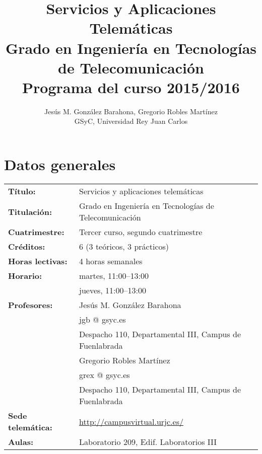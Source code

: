 \documentclass[a4paper,12pt]{article}
\title{Servicios y Aplicaciones Telemáticas \\
Grado en Ingeniería en Tecnologías de Telecomunicación \\
Programa del curso 2015/2016}
\author{Jesús M. González Barahona, Gregorio Robles Martínez \\
GSyC, Universidad Rey Juan Carlos}
\date{}
\begin{document}
\maketitle

\tableofcontents

\newpage

\section{Datos generales}

\begin{tabular}{ll}
\textbf{Título:} & Servicios y aplicaciones telemáticas \\
\textbf{Titulación:} & Grado en Ingeniería en Tecnologías de Telecomunicación \\
\textbf{Cuatrimestre:} & Tercer curso, segundo cuatrimestre \\
\textbf{Créditos:} & 6 (3 teóricos, 3 prácticos) \\
\textbf{Horas lectivas:} & 4 horas semanales \\
\textbf{Horario:} & martes, 11:00--13:00 \\
                  & jueves, 11:00--13:00 \\
\textbf{Profesores:}
& Jesús M. González Barahona \\
& \hspace{1cm}jgb @ gsyc.es \\
& \hspace{1cm}Despacho 110, Departamental III, Campus de Fuenlabrada\\
& Gregorio Robles Martínez\\
& \hspace{1cm}grex @ gsyc.es \\
& \hspace{1cm}Despacho 110, Departamental III, Campus de Fuenlabrada\\
\textbf{Sede telemática:} & \url{http://campusvirtual.urjc.es/} \\
\textbf{Aulas:} & Laboratorio 209, Edif. Laboratorios III \\
\end{tabular}

\newpage

\end{document}
